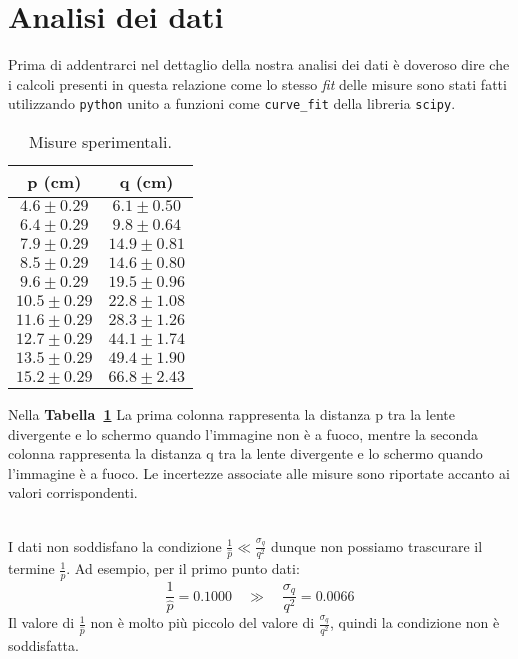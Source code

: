 \documentclass{article}
\begin{document}
\section{Analisi dei dati}
Prima di addentrarci nel dettaglio della nostra analisi dei dati è doveroso dire che i calcoli presenti in questa relazione come lo stesso \textit{fit} delle misure sono stati fatti utilizzando \texttt{python} unito a funzioni come \texttt{curve\_fit} della libreria \texttt{scipy}.
\\
\begin{table}[htbp]
\begin{minipage}{0.55\textwidth}
\centering
\begin{tabular}{cc}
\toprule
p (cm) & q (cm) \\
\midrule
\midrule
$4.6 \pm 0.29$ & $6.1 \pm 0.50$ \\
$6.4 \pm 0.29$ & $9.8 \pm 0.64$ \\
$7.9 \pm 0.29$ & $14.9 \pm 0.81$ \\
$8.5 \pm 0.29$ & $14.6 \pm 0.80$ \\
$9.6 \pm 0.29$ & $19.5 \pm 0.96$ \\
$10.5 \pm 0.29$ & $22.8 \pm 1.08$ \\
$11.6 \pm 0.29$ & $28.3 \pm 1.26$ \\
$12.7 \pm 0.29$ & $44.1 \pm 1.74$ \\
$13.5 \pm 0.29$ & $49.4 \pm 1.90$ \\
$15.2 \pm 0.29$ & $66.8 \pm 2.43$ \\
\bottomrule
\end{tabular}
\caption{Misure sperimentali.}
\label{tab:misure_focale}
\end{minipage}
\hfill
\begin{minipage}{0.45\textwidth}
Nella \textbf{Tabella~\ref{tab:misure_focale}} La prima colonna rappresenta la distanza p tra la lente divergente e lo schermo quando l'immagine non è a fuoco, mentre la seconda colonna rappresenta la distanza q tra la lente divergente e lo schermo quando l'immagine è a fuoco. Le incertezze associate alle misure sono riportate accanto ai valori corrispondenti.
\end{minipage}
\end{table}
\\
I dati non soddisfano la condizione $\frac{1}{\hat{p}} \ll \frac{\sigma_q}{q^2}$ dunque non possiamo trascurare il termine $\frac{1}{p}$. Ad esempio, per il primo punto dati:
\begin{equation*}
\frac{1}{\hat{p}} = 0.1000 \quad \gg \quad \frac{\sigma_q}{q^2} = 0.0066
\end{equation*}
Il valore di $\frac{1}{\hat{p}}$ non è molto più piccolo del valore di $\frac{\sigma_q}{q^2}$, quindi la condizione non è soddisfatta.
\end{document}
